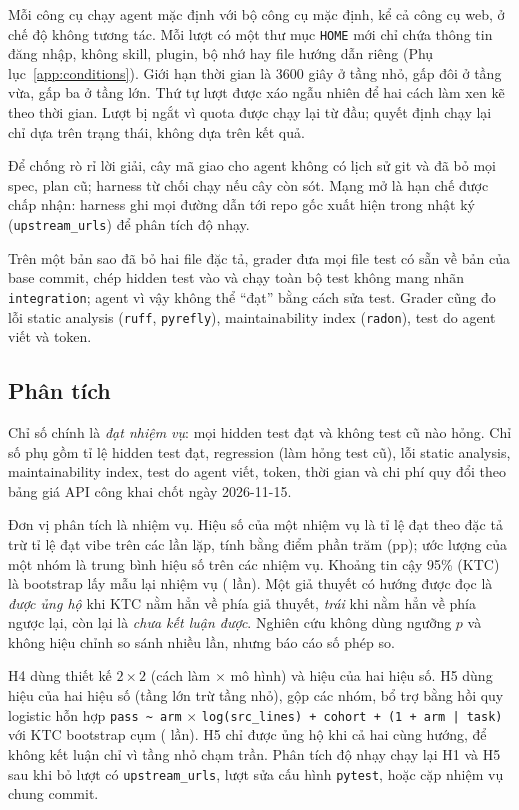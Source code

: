 Mỗi công cụ chạy agent mặc định với bộ công cụ mặc định, kể cả công cụ web, ở chế độ không tương tác. Mỗi
lượt có một thư mục \texttt{HOME} mới chỉ chứa thông tin đăng nhập, không skill, plugin, bộ nhớ hay file hướng
dẫn riêng (Phụ lục~\ref{app:conditions}). Giới hạn thời gian là 3600 giây ở tầng nhỏ, gấp đôi ở tầng vừa, gấp
ba ở tầng lớn. Thứ tự lượt được xáo ngẫu nhiên để hai cách làm xen kẽ theo thời gian. Lượt bị ngắt vì quota
được chạy lại từ đầu; quyết định chạy lại chỉ dựa trên trạng thái, không dựa trên kết quả.

Để chống rò rỉ lời giải, cây mã giao cho agent không có lịch sử git và đã bỏ mọi spec, plan cũ; harness
từ chối chạy nếu cây còn sót. Mạng mở là hạn chế được chấp nhận: harness ghi mọi đường dẫn tới repo gốc xuất
hiện trong nhật ký (\texttt{upstream\_urls}) để phân tích độ nhạy.

Trên một bản sao đã bỏ hai file đặc tả, grader đưa mọi file test có sẵn về bản của base commit,
chép hidden test vào và chạy toàn bộ test không mang nhãn \texttt{integration}; agent vì vậy không thể ``đạt''
bằng cách sửa test. Grader cũng đo lỗi static analysis (\texttt{ruff}, \texttt{pyrefly}), maintainability index
(\texttt{radon}), test do agent viết và token.

\subsection{Phân tích}\label{sec:analysis}

Chỉ số chính là \emph{đạt nhiệm vụ}: mọi hidden test đạt và không test cũ nào hỏng. Chỉ số phụ gồm tỉ lệ hidden test
đạt, regression (làm hỏng test cũ), lỗi static analysis, maintainability index, test do agent viết, token, thời gian và chi phí quy đổi theo bảng giá
API công khai chốt ngày \mbox{2026-11-15}.

Đơn vị phân tích là nhiệm vụ. Hiệu số của một nhiệm vụ là tỉ lệ đạt theo đặc tả trừ tỉ lệ đạt vibe trên các lần
lặp, tính bằng điểm phần trăm (pp); ước lượng của một nhóm là trung bình hiệu số trên các nhiệm vụ. Khoảng tin
cậy 95\% (KTC) là bootstrap lấy mẫu lại nhiệm vụ (\NumResBootstrapB{} lần). Một giả thuyết có hướng được đọc là
\emph{được ủng hộ} khi KTC nằm hẳn về phía giả thuyết, \emph{trái} khi nằm hẳn về phía ngược lại, còn lại là
\emph{chưa kết luận được}. Nghiên cứu không dùng ngưỡng $p$ và không hiệu chỉnh so sánh nhiều lần, nhưng báo
cáo số phép so.

H4 dùng thiết kế $2\times 2$ (cách làm $\times$ mô hình) và hiệu của hai hiệu số. H5 dùng hiệu của hai hiệu số
(tầng lớn trừ tầng nhỏ), gộp các nhóm, bổ trợ bằng hồi quy logistic hỗn hợp
\texttt{pass \textasciitilde{} arm} $\times$ \texttt{log(src\_lines) + cohort + (1 + arm | task)} với KTC
bootstrap cụm (\NumResModelBootstrapB{} lần). H5 chỉ được ủng hộ khi cả hai cùng hướng, để không kết luận chỉ vì
tầng nhỏ chạm trần. Phân tích độ nhạy chạy lại H1 và H5 sau khi bỏ lượt có \texttt{upstream\_urls}, lượt sửa
cấu hình \texttt{pytest}, hoặc cặp nhiệm vụ chung commit.

